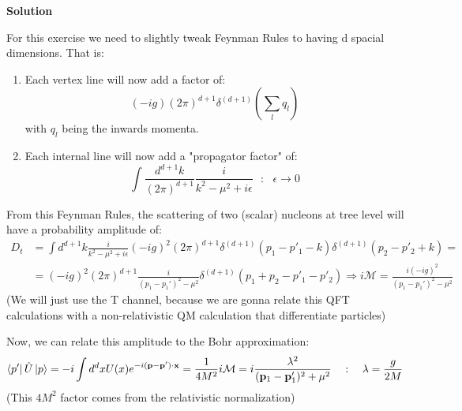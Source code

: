 \documentclass[12pt]{article}
\begin{document}
\color{blue}

\vspace{.25cm}

\textbf{Solution}

For this exercise we need to slightly tweak Feynman Rules to having d spacial dimensions. That is:
\begin{enumerate}
    \item Each vertex line will now add a factor of:
        \[
            (-ig)(2\pi)^{d+1} \delta^{(d+1)}\left(\sum_l q_l\right)
        \]
        with $q_l$ being the inwards momenta.
    \item Each internal line will now add a "propagator factor" of:
        \[
            \int\frac{d^{d+1}k}{(2\pi)^{d+1}}\frac{i}{k^2-\mu^2+i\epsilon} ~~~ : ~~~ \epsilon \rightarrow 0
        \]
\end{enumerate}
From this Feynman Rules, the scattering of two (scalar) nucleons at tree level will have a probability amplitude of:
\[
    \begin{aligned}
        D_t &= \int d^{d+1}k \frac{i}{k^2-\mu^2+i\epsilon}(-ig)^2(2\pi)^{d+1}\delta^{(d+1)}\left(p_1-p'_1-k\right)\delta^{(d+1)}\left(p_2-p'_2+k\right)=\\
            &= (-ig)^2(2\pi)^{d+1}\frac{i}{(p_1-p_1')^2-\mu^2}\delta^{(d+1)}(p_1 + p_2 - p'_1 - p'_2) \Rightarrow i\mathcal{M} = \frac{i(-ig)^2}{(p_1-p_1')^2-\mu^2}
    \end{aligned}
\]
(We will just use the T channel, because we are gonna relate this QFT calculations with a non-relativistic QM calculation that differentiate particles)

\vspace{.25cm}

Now, we can relate this amplitude to the Bohr approximation:
\[
    \bra{p'}\hat{U}\ket{p} = -i\int d^dx U(x)e^{-i(\mathbf{p}-\mathbf{p}')\cdot \mathbf{x}} = \frac{1}{4M^2}i\mathcal{M} = i\frac{\lambda^2}{(\mathbf{p}_1-\mathbf{p}_1')^2+\mu^2} ~~~:~~~ \lambda=\frac{g}{2M}
\]
(This $4M^2$ factor comes from the relativistic normalization)

\vspace{.25cm}
\end{document}
